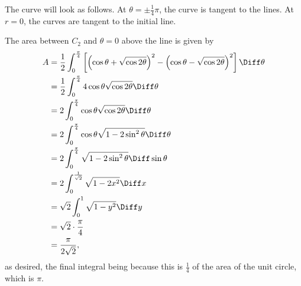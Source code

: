 \begin{enumerate}
          The curve will look as follows. At \(\theta = \pm \frac{1}{4}\pi\), the curve is tangent to the lines. At \(r = 0\), the curves are tangent to the initial line.
          \begin{center}
              
          \end{center}

          The area between \(C_2\) and \(\theta = 0\) above the line is given by
          \begin{align*}
              A & = \frac{1}{2} \int_{0}^{\frac{\pi}{4}} \left[\left(\cos \theta + \sqrt{\cos 2\theta}\right)^2 -  \left(\cos \theta - \sqrt{\cos 2\theta}\right)^2\right]\Diff \theta \\
                & = \frac{1}{2} \int_{0}^{\frac{\pi}{4}} 4 \cos \theta \sqrt{\cos 2\theta} \Diff \theta                                                                                \\
                & = 2 \int_{0}^{\frac{\pi}{4}} \cos \theta \sqrt{\cos 2\theta} \Diff \theta                                                                                            \\
                & = 2 \int_{0}^{\frac{\pi}{4}} \cos \theta \sqrt{1 - 2 \sin^2 \theta} \Diff \theta                                                                                     \\
                & = 2 \int_{0}^{\frac{\pi}{4}} \sqrt{1 - 2 \sin^2 \theta} \Diff \sin \theta                                                                                            \\
                & = 2 \int_{0}^{\frac{1}{\sqrt{2}}} \sqrt{1 - 2x^2} \Diff x                                                                                                            \\
                & = \sqrt{2} \int_{0}^{1} \sqrt{1 - y^2} \Diff y                                                                                                                       \\
                & = \sqrt{2} \cdot \frac{\pi}{4}                                                                                                                                       \\
                & = \frac{\pi}{2 \sqrt{2}},
          \end{align*}
          as desired, the final integral being because this is \(\frac{1}{4}\) of the area of the unit circle, which is \(\pi\).
\end{enumerate}